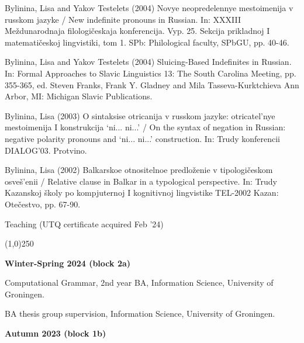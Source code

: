 \documentclass[12pt,letterpaper]{article}
\begin{document}
{\begin{hangparas}{.25in}{1}
\vspace{1mm}

Bylinina, Lisa and Yakov Testelets (2004) Novye neopredelennye mestoimenija v russkom jazyke / New indefinite pronouns in Russian. In: XXXIII Me\v{z}dunarodnaja filologi\v{c}eskaja konferencija. Vyp. 25. Sekcija prikladnoj I matemati\v{c}eskoj lingvistiki, tom 1. SPb: Philological faculty, SPbGU, pp. 40-46. 

\vspace{1mm}

Bylinina, Lisa and Yakov Testelets (2004) Sluicing-Based Indefinites in Russian. In: Formal Approaches to Slavic Linguistics 13: The South Carolina Meeting, pp. 355-365, ed. Steven Franks, Frank Y. Gladney and Mila Tasseva-Kurktchieva Ann Arbor, MI: Michigan Slavic Publications.

\vspace{1mm}

Bylinina, Lisa (2003) O sintaksise otricanija v russkom jazyke: otricatel'nye mestoimenija I konstrukcija `ni... ni...' / On the syntax of negation in Russian: negative polarity pronouns and `ni... ni...' construction. In: Trudy konferencii DIALOG'03. Protvino. 

\vspace{1mm}

Bylinina, Lisa (2002) Balkarskoe otnositelnoe predlo\v{z}enie v tipologi\v{c}eskom osve\v{s}'enii / Relative clause in Balkar in a typological perspective. In: Trudy Kazanskoj \v{s}koly po kompjuternoj I kognitivnoj lingvistike TEL-2002 Kazan: Ote\v{c}estvo, pp. 67-90. 

\end{hangparas}

\vspace{5mm}

\noindent \Large{Teaching} \normalsize{(UTQ certificate acquired Feb '24)}

\vspace{-3mm}
\noindent\line(1,0){250}

\vspace{2mm}
\small{
\noindent\textbf{Winter-Spring 2024 (block 2a)} 

Computational Grammar, 2nd year BA, Information Science, University of Groningen.

BA thesis group supervision, Information Science, University of Groningen.
}

\vspace{2mm}

\vspace{2mm}
\small{
\noindent\textbf{Autumn 2023 (block 1b)} 

}}
\end{document}

